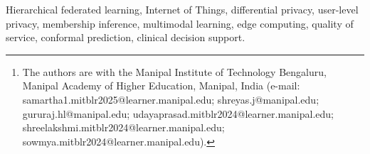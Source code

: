 \else
\author{Samartha~H~V, Shreyas~J, Gururaj~H~L, Udayaprasad~P~K, Shreelakshmi~Yadav~N,
and Sowmya~T~Rao%
\thanks{The authors are with the Manipal Institute of Technology Bengaluru,
Manipal Academy of Higher Education, Manipal, India (e-mail:
samartha1.mitblr2025@learner.manipal.edu;
shreyas.j@manipal.edu;
gururaj.hl@manipal.edu;
udayaprasad.mitblr2024@learner.manipal.edu;
shreelakshmi.mitblr2024@learner.manipal.edu;
sowmya.mitblr2024@learner.manipal.edu).}}
\fi


\maketitle



\begin{IEEEkeywords}
Hierarchical federated learning, Internet of Things, differential privacy,
user-level privacy, membership inference, multimodal learning, edge computing,
quality of service, conformal prediction, clinical decision support.
\end{IEEEkeywords}

\IEEEpeerreviewmaketitle














